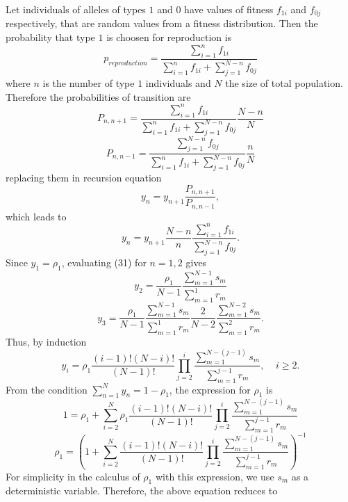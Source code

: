 Let individuals of alleles of types $1$ and $0$ have values of fitness $f_{1i}$ and $f_{0j}$ respectively, that are random values from a fitness distribution. Then the probability that type $1$ is choosen for reproduction is
\begin{equation}
p_{reproduction}=\frac{\sum_{i=1}^{n}f_{1i}}{\sum_{i=1}^{n}f_{1i} + \sum_{j=1}^{N-n}f_{0j}}
\end{equation} 
where $n$ is the number of type $1$ individuals and $N$ the size of total population. Therefore the probabilities of transition are
\begin{equation}
P_{n,n+1}=\frac{\sum_{i=1}^{n}f_{1i}}{\sum_{i=1}^{n}f_{1i} + \sum_{j=1}^{N-n}f_{0j}}\frac{N-n}{N}
\end{equation}
\begin{equation}
P_{n,n-1}=\frac{\sum_{j=1}^{N-n}f_{0j}}{\sum_{i=1}^{n}f_{1i} + \sum_{j=1}^{N-n}f_{0j}}\frac{n}{N}
\end{equation}
replacing them in recursion equation
\begin{equation}
y_{n}=y_{n+1}\frac{P_{n,n+1}}{P_{n,n-1}},
\end{equation}
which leads to
\begin{equation}
y_{n}=y_{n+1}\frac{N-n}{n}\frac{\sum\limits_{i=1}^{n}f_{1i}}{ \sum\limits_{j=1}^{N-n}f_{0j}}.
\end{equation}
Since $y_1=\rho_1$, evaluating (31) for $n=1,2$ gives 
\begin{equation}
y_2 =\frac{\rho_1}{N-1}\frac{\sum\limits_{m=1}^{N-1}s_{m}}{\sum\limits_{m=1}^{1}r_{m}}
\end{equation}
\begin{equation}
y_3 =\frac{\rho_1}{N-1}\frac{\sum\limits_{m=1}^{N-1}s_{m}}{\sum\limits_{m=1}^{1}r_{m}}\frac{2}{N-2}\frac{\sum\limits_{m=1}^{N-2}s_{m}}{\sum\limits_{m=1}^{2}r_{m}}.
\end{equation}
Thus, by induction 
\begin{equation}
y_{i}=\rho_1\frac{(i-1)!(N-i)!}{(N-1)!}\prod\limits_{j=2}^{i}{\frac{\sum\limits_{m=1}^{N-(j-1)}s_m}{\sum\limits_{m=1}^{j-1}r_m}},\;\;\;\; i\geq 2.
\end{equation}
From the condition $\sum_{n=1}^{N}{y_n}=1-\rho_{1}$, the expression for $\rho_1$ is
\begin{equation}
1=\rho_1 + \sum\limits_{i=2}^{N}{\rho_1\frac{(i-1)!(N-i)!}{(N-1)!}\prod\limits_{j=2}^{i}{\frac{\sum\limits_{m=1}^{N-(j-1)}s_m}{\sum\limits_{m=1}^{j-1}r_m}}}
\end{equation}
\begin{equation}
\rho_1=\left(1 + \sum\limits_{i=2}^{N}{\frac{(i-1)!(N-i)!}{(N-1)!}\prod\limits_{j=2}^{i}{\frac{\sum\limits_{m=1}^{N-(j-1)}s_m}{\sum\limits_{m=1}^{j-1}r_m}}}\right)^{-1}
\end{equation}
For simplicity in the calculus of $\rho_{1}$ with this expression, we use $s_{m}$ as a deterministic variable. Therefore, the above equation reduces to


